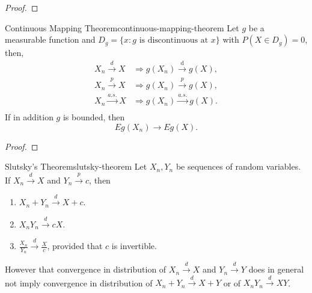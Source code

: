 \begin{proof}
    
\end{proof}

\begin{theorem}{Continuous Mapping Theorem}{continuous-mapping-theorem}
    Let $g$ be a measurable function and $D_g=\{x:g \text{ is discontinuous at } x\}$ with $P(X\in D_g)=0$, then,
    \begin{equation}
        \begin{aligned}
            X_{n} \stackrel{d}{\rightarrow} X & \Rightarrow g\left(X_{n}\right) \stackrel{\mathrm{d}}{\rightarrow} g(X), \\
            X_{n} \stackrel{p}{\rightarrow} X & \Rightarrow g\left(X_{n}\right) \stackrel{p}{\rightarrow} g(X), \\
            X_{n} \stackrel{a.s.}{\rightarrow} X & \Rightarrow g\left(X_{n}\right) \stackrel{a.s.}{\rightarrow} g(X). \\
        \end{aligned}
    \end{equation}
    If in addition $g$ is bounded, then
    \begin{equation}
        Eg(X_n)\rightarrow Eg(X).
    \end{equation}
\end{theorem}

\begin{proof}
    
\end{proof}

\begin{theorem}{Slutsky's Theorem}{slutsky-theorem}
    Let $X_{n}, Y_{n}$ be sequences of random variables. If $X_{n}\stackrel{d}{\rightarrow}X$ and $Y_{n}\stackrel{p}{\rightarrow}c$, then
    \begin{enumerate}
        \item $X_{n}+Y_{n}\stackrel{d}{\rightarrow}X+c$.
        \item $X_{n}Y_{n}\stackrel{d}{\rightarrow}cX$.
        \item $\frac{X_{n}}{Y_{n}}\stackrel{d}{\rightarrow}\frac{X}{c}$, provided that $c$ is invertible.
    \end{enumerate}
\end{theorem}

\begin{note}
    However that convergence in distribution of $X_{n}\stackrel{d}{\rightarrow}X$ and $Y_{n}\stackrel{d}{\rightarrow}Y$ does in general not imply convergence in distribution of $X_n+Y_n\stackrel{d}{\rightarrow}X+Y$ or of $X_nY_n\stackrel{d}{\rightarrow}XY$.
\end{note}

